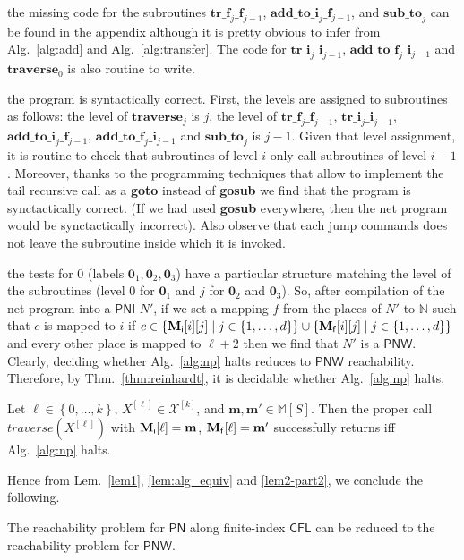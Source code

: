 \documentclass{fsttcs}
\def\set#1{{\left\{ #1 \right\}}}
\def\nats{{\mathbb{N}}}
\newcommand{\multiset}[1]{{\mathbb{M}[ #1 ]}}
\def\mmap{\mathbf{m}}
\def\cfl{\mathsf{CFL}}
\def\pn{\mathsf{PN}}
\def\pni{\mathsf{PNI}}
\def\pnw{\mathsf{PNW}}
\begin{document}
\begin{minipage}[t]{.50\linewidth}
	\noindent \textbullet{} 
the missing code for the subroutines
		\(\mathbf{tr\_f}_{j}\mathbf{\_f}_{j-1}\),
		\(\mathbf{add\_to\_i}_{j}\_\mathbf{f}_{j-1}\),
		and \(\mathbf{sub\_to}_{j}\) can be found in the appendix although it is pretty obvious to infer from
		Alg.~\ref{alg:add} and Alg.~\ref{alg:transfer}. The code for \(\mathbf{tr\_i}_{j}\mathbf{\_i}_{j-1}\),
		\(\mathbf{add\_to\_f}_{j}\_\mathbf{i}_{j-1}\) and \(\mathbf{traverse}_{0}\) is also routine to write.

		\noindent \textbullet{}
the program is syntactically correct. First, the levels are assigned to
		subroutines as follows: the level of \(\mathbf{traverse}_j\) is \(j\), the
		level of \(\mathbf{tr\_f}_{j}\mathbf{\_f}_{j-1}\),
		\(\mathbf{tr\_i}_{j}\mathbf{\_i}_{j-1}\),
		\(\mathbf{add\_to\_i}_{j}\_\mathbf{f}_{j-1}\),
		\(\mathbf{add\_to\_f}_{j}\_\mathbf{i}_{j-1}\) and \(\mathbf{sub\_to}_{j}\)
		is \(j-1\).  Given that level assignment, it is routine to check that
		subroutines of level \(i\) only call subroutines of level \(i-1\).
		Moreover, thanks to the programming techniques that allow to implement the
		tail recursive call as a \textbf{goto} instead of \textbf{gosub} we find
		that the program is synctactically correct.  (If we had used \textbf{gosub}
		everywhere, then the net program would be synctactically incorrect).  Also
		observe that each jump commands does not leave the subroutine inside which it is
		invoked.  

\noindent \textbullet{} the tests for 0 (labels
		\(\boldsymbol{0}_1,\boldsymbol{0}_2,\boldsymbol{0}_3\)) have a particular
		structure matching the level of the subroutines (level \(0\) for
		\(\boldsymbol{0}_1\) and \(j\) for \(\boldsymbol{0}_2\) and
		\(\boldsymbol{0}_3\)). So, after compilation of the net program into a \(\pni\) \(N'\),
		if we set a mapping \(f\) from the places of
		\(N'\) to \(\nats\) such that \(c\) is mapped to \(i\) if \(c\in
		\set{\mathbf{M}_{\sf i}[i][j]\mid
		j\in\set{1,\ldots,d}}\cup\set{\mathbf{M}_{\sf f}[i][j]\mid
		j\in\set{1,\ldots,d}}\) and every other place is mapped to \(\ell+2\) then we
		find that \(N'\) is a \(\pnw\). Clearly, deciding whether
		Alg.~\ref{alg:np} halts reduces to \(\pnw\) reachability.
		Therefore, by Thm.~\ref{thm:reinhardt}, it is decidable whether Alg.~\ref{alg:np} halts.
\end{minipage}\hfill

\begin{lemma}
\label{lem2-part2}
Let $\ell \in \set{0,\ldots,k}$, $X^{[\ell]}\in\mathcal{X}^{[k]}$, and
$\mmap,\mmap'\in\multiset{S}$. Then the proper call \(\mathit{traverse}(X^{[\ell]})\) with 
$\mathbf{M_{\sf i}}[\ell]=\mmap$, $\mathbf{M_{\sf f}}[\ell]=\mmap'$
successfully returns if{}f Alg.~\ref{alg:np} halts.
\end{lemma}
Hence from Lem.~\ref{lem1}, \ref{lem:alg_equiv} and \ref{lem2-part2}, we conclude the following.
\begin{corollary}
The reachability problem for
\(\pn\) along finite-index \(\cfl\)  can be reduced to the reachability problem for \(\pnw\). 
\end{corollary}
\end{document}
